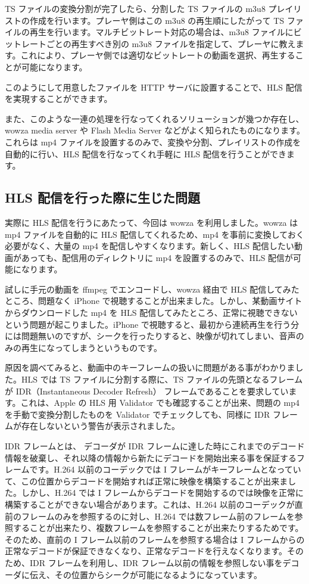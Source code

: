  TS ファイルの変換分割が完了したら、分割した TS ファイルの m3u8 プレイリストの作成を行います。プレーヤ側はこの m3u8 の再生順にしたがって TS ファイルの再生を行います。マルチビットレート対応の場合は、m3u8 ファイルにビットレートごとの再生すべき別の m3u8 ファイルを指定して、プレーヤに教えます。これにより、プレーヤ側では適切なビットレートの動画を選択、再生することが可能になります。

 このようにして用意したファイルを HTTP サーバに設置することで、HLS 配信を実現することができます。

 また、このような一連の処理を行なってくれるソリューションが幾つか存在し、wowza media server や Flash Media Server などがよく知られたものになります。これらは mp4 ファイルを設置するのみで、変換や分割、プレイリストの作成を自動的に行い、HLS 配信を行なってくれ手軽に HLS 配信を行うことができます。

\subsection{HLS 配信を行った際に生じた問題}
 実際に HLS 配信を行うにあたって、今回は wowza を利用しました。wowza は mp4 ファイルを自動的に HLS 配信してくれるため、mp4 を事前に変換しておく必要がなく、大量の mp4 を配信しやすくなります。新しく、HLS 配信したい動画があっても、配信用のディレクトリに mp4 を設置するのみで、HLS 配信が可能になります。

 試しに手元の動画を ffmpeg でエンコードし、wowza 経由で HLS 配信してみたところ、問題なく iPhone で視聴することが出来ました。しかし、某動画サイトからダウンロードした mp4 を HLS 配信してみたところ、正常に視聴できないという問題が起こりました。iPhone で視聴すると、最初から連続再生を行う分には問題無いのですが、シークを行ったりすると、映像が切れてしまい、音声のみの再生になってしまうというものです。

 原因を調べてみると、動画中のキーフレームの扱いに問題がある事がわかりました。HLS では TS ファイルに分割する際に、TS ファイルの先頭となるフレームが IDR（Instantaneous Decoder Refresh） フレームであることを要求しています。これは、Apple の HLS 用 Validator でも確認することが出来、問題の mp4 を手動で変換分割したものを Validator でチェックしても、同様に IDR フレームが存在しないという警告が表示されました。

 IDR フレームとは、 デコーダが IDR フレームに達した時にこれまでのデコード情報を破棄し、それ以降の情報から新たにデコードを開始出来る事を保証するフレームです。H.264 以前のコーデックでは I フレームがキーフレームとなっていて、この位置からデコードを開始すれば正常に映像を構築することが出来ました。しかし、H.264 では I フレームからデコードを開始するのでは映像を正常に構築することができない場合があります。これは、H.264 以前のコーデックが直前のフレームのみを参照するのに対し、H.264 では数フレーム前のフレームを参照することが出来たり、複数フレームを参照することが出来たりするためです。そのため、直前の I フレーム以前のフレームを参照する場合は I フレームからの正常なデコードが保証できなくなり、正常なデコードを行えなくなります。そのため、IDR フレームを利用し、IDR フレーム以前の情報を参照しない事をデコーダに伝え、その位置からシークが可能になるようになっています。


